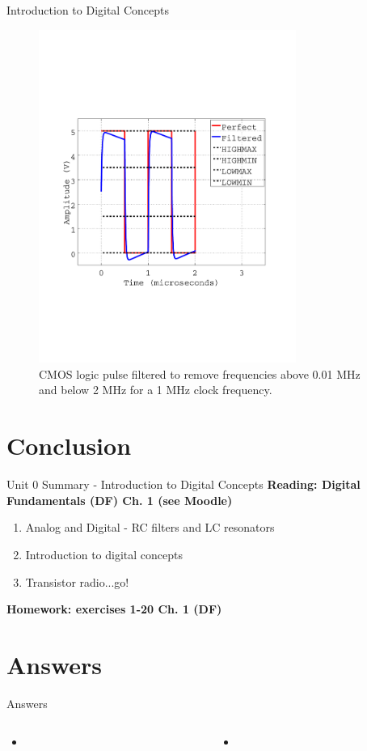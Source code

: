 \documentclass{beamer}
\begin{document}
\begin{frame}{Introduction to Digital Concepts}
\begin{figure}
\centering
\includegraphics[width=0.75\textwidth,trim=1cm 6cm 1cm 7cm,clip=true]{codes/January8_plot1.pdf}
\caption{\label{fig:pulse2} CMOS logic pulse filtered to remove frequencies above 0.01 MHz and below 2 MHz for a 1 MHz clock frequency.}
\end{figure}
\end{frame}

\section{Conclusion}

\begin{frame}{Unit 0 Summary - Introduction to Digital Concepts}
\textbf{Reading: Digital Fundamentals (DF) Ch. 1 (see Moodle)}
\begin{enumerate}
\item Analog and Digital - RC filters and LC resonators
\item Introduction to digital concepts
\item Transistor radio...go!
\end{enumerate}
\textbf{Homework: exercises 1-20 Ch. 1 (DF)}
\end{frame}

\section{Answers}

\begin{frame}{Answers}
\begin{columns}[T]
\begin{column}{0.5\textwidth}
\begin{itemize}
\item 
\end{itemize}
\end{column}
\begin{column}{0.5\textwidth}
\begin{itemize}
\item 
\end{itemize}
\end{column}
\end{columns}
\end{frame}
\end{document}

